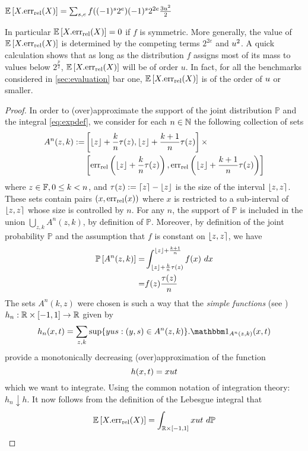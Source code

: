 \begin{proposition}\label{prop:expXerelX}$\mathbb{E}\left[X.\mathrm{err}_{\mathrm{rel}}(X)\right] = \sum_{s,e} f((-1)^s2^e)(-1)^s2^{2e}\frac{3u^2}{2}$
\end{proposition}
In particular $\mathbb{E}\left[X.\mathrm{err}_{\mathrm{rel}}(X)\right]=0$ if $f$ is symmetric. More generally, the value of $\mathbb{E}\left[X.\mathrm{err}_{\mathrm{rel}}(X)\right]$ is determined by the competing terms $2^{2e}$ and $u^2$. A quick calculation shows that as long as the distribution $f$ assigns most of its mass to values below $2^{\frac{p}{2}}$, $\mathbb{E}\left[X.\mathrm{err}_{\mathrm{rel}}(X)\right]$ will be of order $u$. In fact, for all the benchmarks considered in \cref{sec:evaluation} bar one, $\mathbb{E}\left[X.\mathrm{err}_{\mathrm{rel}}(X)\right]$ is of the order of $u$ or smaller.
\begin{proof}
In order to (over)approximate the support of the joint distribution $\mathbb{P}$ and the integral \cref{eq:expdef}, we consider for each $n\in\mathbb{N}$ the following collection of sets
\begin{align*}
A^n(z,k) \mathrel{:=} &\left[\lfloor z \rfloor+\frac{k}{n}\tau(z), \lfloor z \rfloor+\frac{k+1}{n}\tau(z)\right]\times \\
&\left[\mathrm{err}_{\mathrm{rel}}\left(\lfloor z \rfloor+\frac{k}{n}\tau(z)\right), \mathrm{err}_{\mathrm{rel}}\left(\lfloor z \rfloor+\frac{k+1}{n}\tau(z)\right)\right]
\end{align*}
where $z\in \mathbb{F}, 0\leq k < n$, and $\tau(z)\mathrel{:=} \lceil z \rceil-\lfloor z \rfloor$ is the size of the interval $\fintvl$. These sets contain pairs $(x,\mathrm{err}_{\mathrm{rel}}(x))$ where $x$ is restricted to a sub-interval of $\fintvl$ whose size is controlled by $n$. For any $n$, the support of $\mathbb{P}$ is included in the union $\bigcup_{z,k}A^n(z,k)$, by definition of $\mathbb{P}$. Moreover,  by definition of the joint probability $\mathbb{P}$ and the assumption that $f$ is constant on $\fintvl$, we have
\begin{align*}
\mathbb{P}\left[ A^n(z,k) \right] = & \int_{\lfloor z \rfloor+\frac{k}{n}\tau(z)}^{\lfloor z \rfloor+\frac{k+1}{n}} f(x)~dx\\
= & f(z) \frac{\tau(z)}{n}
\end{align*}
The sets $A^n(k,z)$ were chosen is such a way that the \emph{simple functions} (see \cite{dudley2002real}) $h_n: \mathbb{R}\times [-1,1]\to\mathbb{R}$ given by
\[
h_n(x,t) = \sum_{z,k} \sup\{y\uro s : (y,s)\in A^n(z,k)\} .\one_{A^n(z,k)}(x,t)
\]
provide a monotonically decreasing (over)approximation of the function
\[
h(x,t) = xu t
\]
which we want to integrate. Using the common notation of integration theory: $h_n \downarrow h$. It now follows from the definition of the Lebesgue integral that
\begin{align*}
\Exp{X.\erel(X)} & = \int_{\R\times [-1,1]} x\uro t~d\mathbb{P}\\

\end{align*}
\end{proof}
